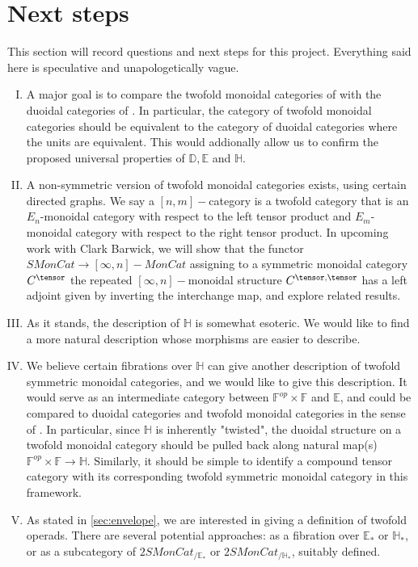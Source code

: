 \section{Next steps}\label{sec:whats-next}
This section will record questions and next steps for this project. Everything said here is speculative and unapologetically vague.

\begin{enumerate}[I.]
    \item A major goal is to compare the twofold monoidal categories of \cite{Bar24} with the duoidal categories of \cite{Torii24}. In particular, the category of twofold monoidal categories should be equivalent to the category of duoidal categories where the units are equivalent. This would addionally allow us to confirm the proposed universal properties of $\mathbb{D},\mathbb{E}$ and $\mathbb{H}$.
    \item A non-symmetric version of twofold monoidal categories exists, using certain directed graphs. We say a $[n,m]-$category is a twofold category that is an $E_n$-monoidal category with respect to the left tensor product and $E_m$-monoidal category with respect to the right tensor product. In upcoming work with Clark Barwick, we will show that the functor $SMonCat\rightarrow [\infty,n]-MonCat$ assigning to a symmetric monoidal category $C^\tensor$ the repeated $[\infty,n]-$monoidal structure $C^{\tensor,\tensor}$ has a left adjoint given by inverting the interchange map, and explore related results.
    \item As it stands, the description of $\mathbb{H}$ is somewhat esoteric. We would like to find a more natural description whose morphisms are easier to describe.
    \item We believe certain fibrations over $\mathbb{H}$ can give another description of twofold symmetric monoidal categories, and we would like to give this description. It would serve as an intermediate category between $\mathbb{F}^{op}\times \mathbb{F}$ and $\mathbb{E}$, and could be compared to duoidal categories and twofold monoidal categories in the sense of \cite{Bar24}. In particular, since $\mathbb{H}$ is inherently "twisted", the duoidal structure on a twofold monoidal category should be pulled back along natural map(s) $\mathbb{F}^{op}\times \mathbb{F}\rightarrow \mathbb{H}$. Similarly, it should be simple to identify a compound tensor category with its corresponding twofold symmetric monoidal category in this framework.
    \item As stated in \cref{sec:envelope}, we are interested in giving a definition of twofold operads. There are several potential approaches: as a fibration over $\mathbb{E}_*$ or $\mathbb{H}_*$, or as a subcategory of $2SMonCat_{/\mathbb{E}_*}$ or $2SMonCat_{/\mathbb{H}_*}$, suitably defined.

\end{enumerate}

